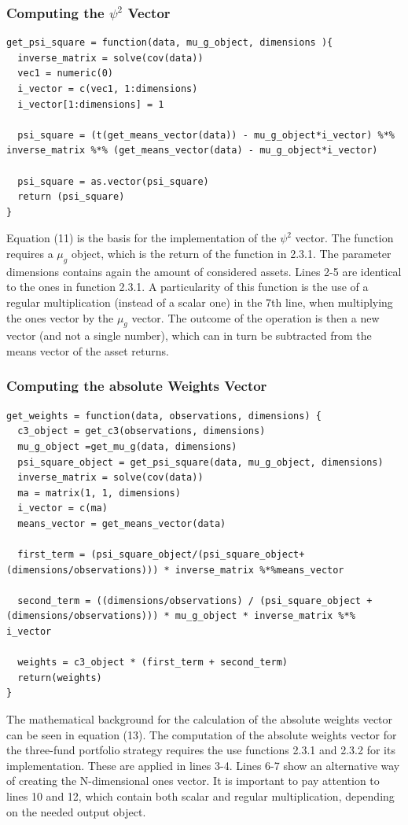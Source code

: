 \documentclass{article}
\begin{document}
\subsubsection{Computing the $\psi^{2}$ Vector}
\begin{lstlisting}[caption={Computation of the $\psi^{2}$ vector in R.}, label=code:1, frame=single]
get_psi_square = function(data, mu_g_object, dimensions ){
  inverse_matrix = solve(cov(data))
  vec1 = numeric(0)
  i_vector = c(vec1, 1:dimensions)
  i_vector[1:dimensions] = 1
  
  psi_square = (t(get_means_vector(data)) - mu_g_object*i_vector) %*% inverse_matrix %*% (get_means_vector(data) - mu_g_object*i_vector)
  
  psi_square = as.vector(psi_square)
  return (psi_square)
}
\end{lstlisting}
Equation (11) is the basis for the implementation of the $\psi^{2}$ vector. The function requires a $\mu_{g}$ object, which is the return of the function in 2.3.1. The parameter dimensions contains again the amount of considered assets. Lines 2-5 are identical to the ones in function 2.3.1. A particularity of this function is the use of a regular multiplication (instead of a scalar one) in the 7th line, when multiplying the ones vector by the $\mu_{g}$ vector. The outcome of the operation is then a new vector (and not a single number), which can in turn be subtracted from the means vector of the asset returns.
\subsubsection{Computing the absolute Weights Vector}
\begin{lstlisting}[caption={Computation of the absolute weights vector in R.}, label=code:1, frame=single]
get_weights = function(data, observations, dimensions) {
  c3_object = get_c3(observations, dimensions)
  mu_g_object =get_mu_g(data, dimensions)
  psi_square_object = get_psi_square(data, mu_g_object, dimensions)
  inverse_matrix = solve(cov(data))
  ma = matrix(1, 1, dimensions) 
  i_vector = c(ma)
  means_vector = get_means_vector(data)
  
  first_term = (psi_square_object/(psi_square_object+(dimensions/observations))) * inverse_matrix %*%means_vector
  
  second_term = ((dimensions/observations) / (psi_square_object + (dimensions/observations))) * mu_g_object * inverse_matrix %*% i_vector

  weights = c3_object * (first_term + second_term)
  return(weights)
}
\end{lstlisting}
The mathematical background for the calculation of the absolute weights vector can be seen in equation (13). The computation of the absolute weights vector for the three-fund portfolio strategy requires the use functions 2.3.1 and 2.3.2 for its implementation. These are applied in lines 3-4. Lines 6-7 show an alternative way of creating the N-dimensional ones vector. It is important to pay attention to lines 10 and 12, which contain both scalar and regular multiplication, depending on the needed output object. 
\end{document}
